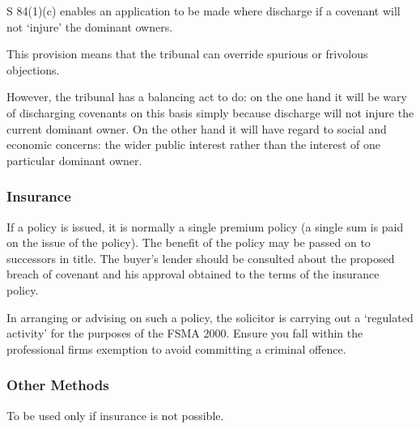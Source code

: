 \documentclass[
]{article}
\newenvironment{Shaded}{}{}
\newcommand{\NormalTok}[1]{#1}
\begin{document}
S 84(1)(c) enables an application to be made where discharge if a
covenant will not `injure' the dominant owners.

This provision means that the tribunal can override spurious or
frivolous objections.

However, the tribunal has a balancing act to do: on the one hand it will
be wary of discharging covenants on this basis simply because discharge
will not injure the current dominant owner. On the other hand it will
have regard to social and economic concerns: the wider public interest
rather than the interest of one particular dominant owner.

\hypertarget{insurance}{%
\subsubsection{Insurance}\label{insurance}}

If a policy is issued, it is normally a single premium policy (a single
sum is paid on the issue of the policy). The benefit of the policy may
be passed on to successors in title. The buyer's lender should be
consulted about the proposed breach of covenant and his approval
obtained to the terms of the insurance policy.

\begin{Shaded}
\begin{Highlighting}[]
\NormalTok{In arranging or advising on such a policy, the solicitor is carrying out a ‘regulated activity’ for the purposes of the FSMA 2000. Ensure you fall within the professional firms exemption to avoid committing a criminal offence.}
\end{Highlighting}
\end{Shaded}

\hypertarget{other-methods}{%
\subsubsection{Other Methods}\label{other-methods}}

To be used only if insurance is not possible.
\end{document}
